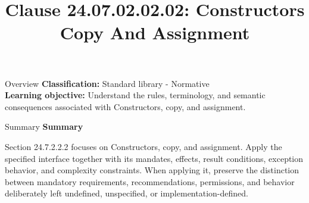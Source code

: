 \documentclass[10pt,letterpaper]{article}
\title{Clause 24.07.02.02.02: Constructors Copy And Assignment}
\author{}
\date{}
\begin{document}
\maketitle
\begin{CornellOverviewBox}{Overview}
\textbf{Classification:} Standard library - Normative\\[2pt]
\textbf{Learning objective:} Understand the rules, terminology, and semantic consequences associated with Constructors, copy, and assignment.
\end{CornellOverviewBox}\begin{CornellSummaryBox}{Summary}
{\sffamily\bfseries\color{Accent} Summary}\par\vspace{3pt}Section 24.7.2.2.2 focuses on Constructors, copy, and assignment. Apply the specified interface together with its mandates, effects, result conditions, exception behavior, and complexity constraints. When applying it, preserve the distinction between mandatory requirements, recommendations, permissions, and behavior deliberately left undefined, unspecified, or implementation-defined.
\end{CornellSummaryBox}
\end{document}
